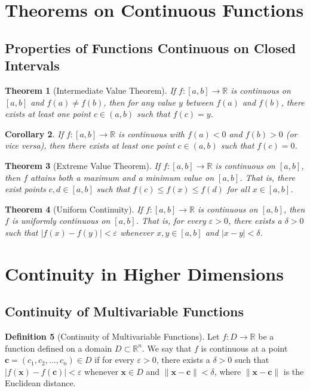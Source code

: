 \documentclass[12pt,a4paper]{article}
\theoremstyle{plain}
\newtheorem{theorem}{Theorem}[section]
\newtheorem{corollary}[theorem]{Corollary}
\theoremstyle{definition}
\newtheorem{definition}[theorem]{Definition}
\begin{document}
\section{Theorems on Continuous Functions}

\subsection{Properties of Functions Continuous on Closed Intervals}

\begin{theorem}[Intermediate Value Theorem]
If $f: [a, b] \to \mathbb{R}$ is continuous on $[a, b]$ and $f(a) \neq f(b)$, then for any value $y$ between $f(a)$ and $f(b)$, there exists at least one point $c \in (a, b)$ such that $f(c) = y$.
\end{theorem}

\begin{corollary}
If $f: [a, b] \to \mathbb{R}$ is continuous with $f(a) < 0$ and $f(b) > 0$ (or vice versa), then there exists at least one point $c \in (a, b)$ such that $f(c) = 0$.
\end{corollary}

\begin{theorem}[Extreme Value Theorem]
If $f: [a, b] \to \mathbb{R}$ is continuous on $[a, b]$, then $f$ attains both a maximum and a minimum value on $[a, b]$. That is, there exist points $c, d \in [a, b]$ such that $f(c) \leq f(x) \leq f(d)$ for all $x \in [a, b]$.
\end{theorem}

\begin{theorem}[Uniform Continuity]
If $f: [a, b] \to \mathbb{R}$ is continuous on $[a, b]$, then $f$ is uniformly continuous on $[a, b]$. That is, for every $\varepsilon > 0$, there exists a $\delta > 0$ such that $|f(x) - f(y)| < \varepsilon$ whenever $x, y \in [a, b]$ and $|x - y| < \delta$.
\end{theorem}

\section{Continuity in Higher Dimensions}

\subsection{Continuity of Multivariable Functions}

\begin{definition}[Continuity of Multivariable Functions]
Let $f: D \to \mathbb{R}$ be a function defined on a domain $D \subset \mathbb{R}^n$. We say that $f$ is continuous at a point $\mathbf{c} = (c_1, c_2, \ldots, c_n) \in D$ if for every $\varepsilon > 0$, there exists a $\delta > 0$ such that $|f(\mathbf{x}) - f(\mathbf{c})| < \varepsilon$ whenever $\mathbf{x} \in D$ and $\|\mathbf{x} - \mathbf{c}\| < \delta$, where $\|\mathbf{x} - \mathbf{c}\|$ is the Euclidean distance.
\end{definition}
\end{document}

